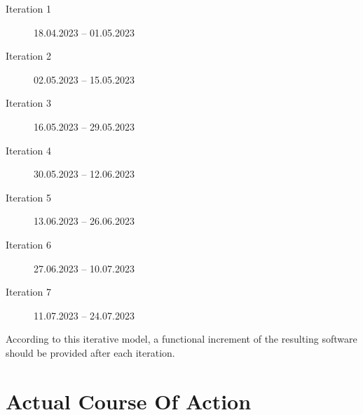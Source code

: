 \begin{multicols}{2}
\begin{description}
    \item[Iteration 1] 18.04.2023 -- 01.05.2023
    \item[Iteration 2] 02.05.2023 -- 15.05.2023
    \item[Iteration 3] 16.05.2023 -- 29.05.2023
    \item[Iteration 4] 30.05.2023 -- 12.06.2023
\end{description}
\begin{description}
    \item[Iteration 5] 13.06.2023 -- 26.06.2023
    \item[Iteration 6] 27.06.2023 -- 10.07.2023
    \item[Iteration 7] 11.07.2023 -- 24.07.2023
\end{description}
\end{multicols}

\noindent According to this iterative model, a functional increment of the resulting software should be provided after each iteration.

\section{Actual Course Of Action}
\label{ch:Approach:sec:Actual Course Of Action}

